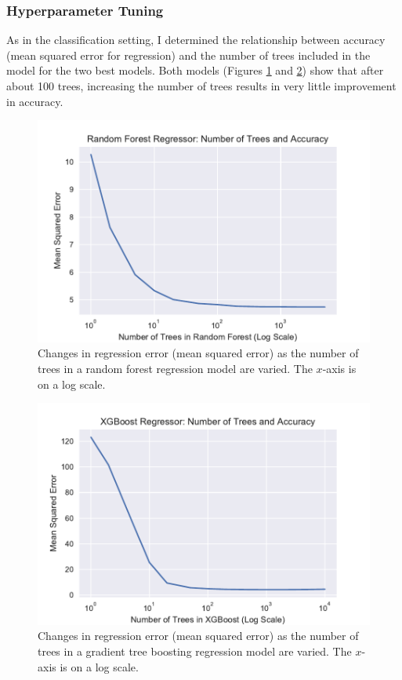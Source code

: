 \documentclass[12pt]{article}
\begin{document}


\subsubsection{Hyperparameter Tuning}

As in the classification setting, I determined the relationship between accuracy (mean squared error for regression) and the number of trees included in the model for the two best models. Both models (Figures \ref{fig:num_trees_rfr} and \ref{fig:num_trees_xgbr}) show that after about 100 trees, increasing the number of trees results in very little improvement in accuracy. 

\begin{figure}[!htbp]
    \centering
    \includegraphics[width=\textwidth]{graphics/num_trees_rfr}
    \caption{Changes in regression error (mean squared error) as the number of trees in a random forest regression model are varied. The $x$-axis is on a log scale.}
    \label{fig:num_trees_rfr}
\end{figure}

\begin{figure}[!htbp]
    \centering
    \includegraphics[width=\textwidth]{graphics/num_trees_xgbr}
    \caption{Changes in regression error (mean squared error) as the number of trees in a gradient tree boosting regression model are varied. The $x$-axis is on a log scale.}
    \label{fig:num_trees_xgbr}
\end{figure}
\end{document}
